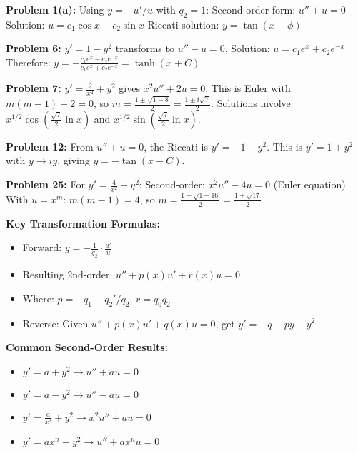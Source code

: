 \documentclass[12pt]{article}
\begin{document}
\textbf{Problem 1(a):} Using $y = -u'/u$ with $q_2 = 1$:
Second-order form: $u'' + u = 0$
Solution: $u = c_1\cos x + c_2\sin x$
Riccati solution: $y = \tan(x - \phi)$

\textbf{Problem 6:} $y' = 1 - y^2$ transforms to $u'' - u = 0$.
Solution: $u = c_1e^x + c_2e^{-x}$
Therefore: $y = -\frac{c_1e^x - c_2e^{-x}}{c_1e^x + c_2e^{-x}} = \tanh(x + C)$

\textbf{Problem 7:} $y' = \frac{2}{x^2} + y^2$ gives $x^2u'' + 2u = 0$.
This is Euler with $m(m-1) + 2 = 0$, so $m = \frac{1 \pm \sqrt{1-8}}{2} = \frac{1 \pm i\sqrt{7}}{2}$.
Solutions involve $x^{1/2}\cos(\frac{\sqrt{7}}{2}\ln x)$ and $x^{1/2}\sin(\frac{\sqrt{7}}{2}\ln x)$.

\textbf{Problem 12:} From $u'' + u = 0$, the Riccati is $y' = -1 - y^2$.
This is $y' = 1 + y^2$ with $y \to iy$, giving $y = -\tan(x - C)$.

\textbf{Problem 25:} For $y' = \frac{4}{x^2} - y^2$:
Second-order: $x^2u'' - 4u = 0$ (Euler equation)
With $u = x^m$: $m(m-1) = 4$, so $m = \frac{1 \pm \sqrt{1+16}}{2} = \frac{1 \pm \sqrt{17}}{2}$

\textbf{Key Transformation Formulas:}
\begin{itemize}
    \item Forward: $y = -\frac{1}{q_2} \cdot \frac{u'}{u}$
    \item Resulting 2nd-order: $u'' + p(x)u' + r(x)u = 0$
    \item Where: $p = -q_1 - q_2'/q_2$, $r = q_0q_2$
    \item Reverse: Given $u'' + p(x)u' + q(x)u = 0$, get $y' = -q - py - y^2$
\end{itemize}

\textbf{Common Second-Order Results:}
\begin{itemize}
    \item $y' = a + y^2 \to u'' + au = 0$
    \item $y' = a - y^2 \to u'' - au = 0$
    \item $y' = \frac{a}{x^2} + y^2 \to x^2u'' + au = 0$
    \item $y' = ax^n + y^2 \to u'' + ax^nu = 0$
\end{itemize}
\end{document}
